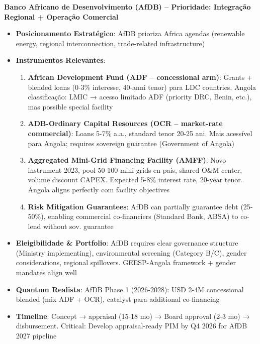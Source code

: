 \documentclass[12pt, a4paper]{article}
\begin{document}
\textbf{Banco Africano de Desenvolvimento (AfDB) – Prioridade: Integração Regional + Operação Comercial}
\begin{itemize}
\item \textbf{Posicionamento Estratégico}: AfDB prioriza Africa agendas (renewable energy, regional interconnection, trade-related infrastructure)
\item \textbf{Instrumentos Relevantes}:
  \begin{enumerate}
  \item \textbf{African Development Fund (ADF – concessional arm)}: Grants + blended loans (0-3\% interesse, 40-anni tenor) para LDC countries. Angola classificação: LMIC → acesso limitado ADF (priority DRC, Benin, etc.), mas possible special facility
  \item \textbf{ADB-Ordinary Capital Resources (OCR – market-rate commercial)}: Loans 5-7\% a.a., standard tenor 20-25 ani. Mais acessível para Angola; requires sovereign guarantee (Government of Angola)
  \item \textbf{Aggregated Mini-Grid Financing Facility (AMFF)}: Novo instrument 2023, pool 50-100 mini-grids en país, shared O\&M center, volume discount CAPEX. Expected 5-8\% interest rate, 20-year tenor. Angola aligns perfectly com facility objectives
  \item \textbf{Risk Mitigation Guarantees}: AfDB can partially guarantee debt (25-50\%), enabling commercial co-financiers (Standard Bank, ABSA) to co-lend without sov. guarantee
  \end{enumerate}
\item \textbf{Eleigibilidade \& Portfolio}: AfDB requires clear governance structure (Ministry implementing), environmental screening (Category B/C), gender considerations, regional spillovers. GEESP-Angola framework + gender mandates align well
\item \textbf{Quantum Realista}: AfDB Phase 1 (2026-2028): USD 2-4M concessional blended (mix ADF + OCR), catalyst para additional co-financing
\item \textbf{Timeline}: Concept → appraisal (15-18 mo) → Board approval (2-3 mo) → disbursement. Critical: Develop appraisal-ready PIM by Q4 2026 for AfDB 2027 pipeline
\end{itemize}
\end{document}
